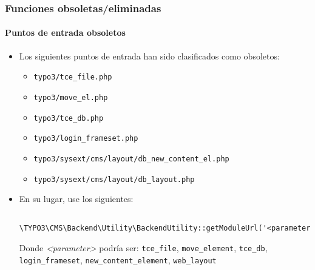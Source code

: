 \begin{frame}[fragile]
	\frametitle{Funciones obsoletas/eliminadas}
	\framesubtitle{Puntos de entrada obsoletos}

	\begin{itemize}
		\item Los siguientes puntos de entrada han sido clasificados como obsoletos:

			\begin{itemize}
				\item \texttt{typo3/tce\_file.php}
				\item \texttt{typo3/move\_el.php}
				\item \texttt{typo3/tce\_db.php}
				\item \texttt{typo3/login\_frameset.php}
				\item \texttt{typo3/sysext/cms/layout/db\_new\_content\_el.php}
				\item \texttt{typo3/sysext/cms/layout/db\_layout.php}
			\end{itemize}

		\item En su lugar, use los siguientes:
			\begin{lstlisting}
				\TYPO3\CMS\Backend\Utility\BackendUtility::getModuleUrl('<parameter>')
			\end{lstlisting}

			Donde \textit{<parameter>} podría ser:\newline
				\small
					\texttt{tce\_file}, \texttt{move\_element}, \texttt{tce\_db},
					\texttt{login\_frameset}, \texttt{new\_content\_element}, \texttt{web\_layout}
				\normalsize
	\end{itemize}

\end{frame}


